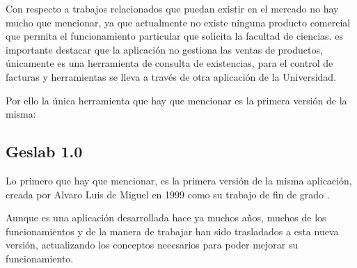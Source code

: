 
Con respecto a trabajos relacionados que puedan existir en el mercado no hay mucho que mencionar, ya que actualmente no existe ninguna producto comercial que permita el funcionamiento particular que solicita la facultad de ciencias. es importante destacar que la aplicación no gestiona las ventas de productos, únicamente es una herramienta de consulta de existencias, para el control de facturas y herramientas se lleva a través de otra aplicación de la Universidad.

Por ello la única herramienta que hay que mencionar es la primera versión de la misma:

\subsection{Geslab 1.0}
Lo primero que hay que mencionar, es la primera versión de la misma aplicación, creada por Alvaro Luis de Miguel en 1999 como su trabajo de fin de grado \cite{GeslabV1}. 

Aunque es una aplicación desarrollada hace ya muchos años, muchos de los funcionamientos y de la manera de trabajar han sido trasladados a esta nueva versión, actualizando los conceptos necesarios para poder mejorar su funcionamiento.

